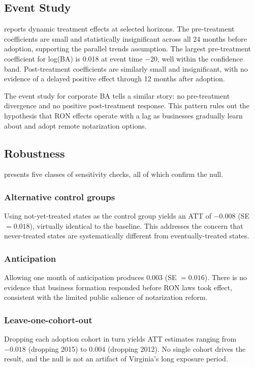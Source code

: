 \documentclass[12pt]{article}
\begin{document}
\subsection{Event Study}

 reports dynamic treatment effects at selected horizons. The pre-treatment coefficients are small and statistically insignificant across all 24 months before adoption, supporting the parallel trends assumption. The largest pre-treatment coefficient for log(BA) is 0.018 at event time $-20$, well within the confidence band. Post-treatment coefficients are similarly small and insignificant, with no evidence of a delayed positive effect through 12 months after adoption.



The event study for corporate BA tells a similar story: no pre-treatment divergence and no positive post-treatment response. This pattern rules out the hypothesis that RON effects operate with a lag as businesses gradually learn about and adopt remote notarization options.

\subsection{Robustness}

 presents five classes of sensitivity checks, all of which confirm the null.



\subsubsection*{Alternative control groups} Using not-yet-treated states as the control group yields an ATT of $-0.008$ (SE $= 0.018$), virtually identical to the baseline. This addresses the concern that never-treated states are systematically different from eventually-treated states.

\subsubsection*{Anticipation} Allowing one month of anticipation produces $0.003$ (SE $= 0.016$). There is no evidence that business formation responded before RON laws took effect, consistent with the limited public salience of notarization reform.

\subsubsection*{Leave-one-cohort-out} Dropping each adoption cohort in turn yields ATT estimates ranging from $-0.018$ (dropping 2015) to $0.004$ (dropping 2012). No single cohort drives the result, and the null is not an artifact of Virginia's long exposure period.
\end{document}

